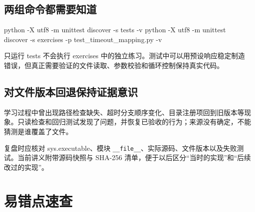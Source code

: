 \subsection{两组命令都需要知道}

\begin{Code}
python -X utf8 -m unittest discover -s tests -v
python -X utf8 -m unittest discover -s exercises -p test_timeout_mapping.py -v
\end{Code}

只运行 tests 不会执行 exercises 中的独立练习。测试中可以用预设响应稳定制造错误，但真正需要验证的文件读取、参数校验和循环控制保持真实代码。

\subsection{对文件版本回退保持证据意识}

学习过程中曾出现路径检查缺失、超时分支顺序变化、目录注册项回到旧版本等现象。只读检查和回归测试发现了问题，并恢复已验收的行为；来源没有确定，不能猜测是谁覆盖了文件。

复盘时应核对 sys.executable、模块 \nolinkurl{__file__}、实际源码、文件版本以及失败测试。当前讲义附带源码快照与 SHA-256 清单，便于以后区分“当时的实现”和“后续改过的实现”。

\section{易错点速查}

